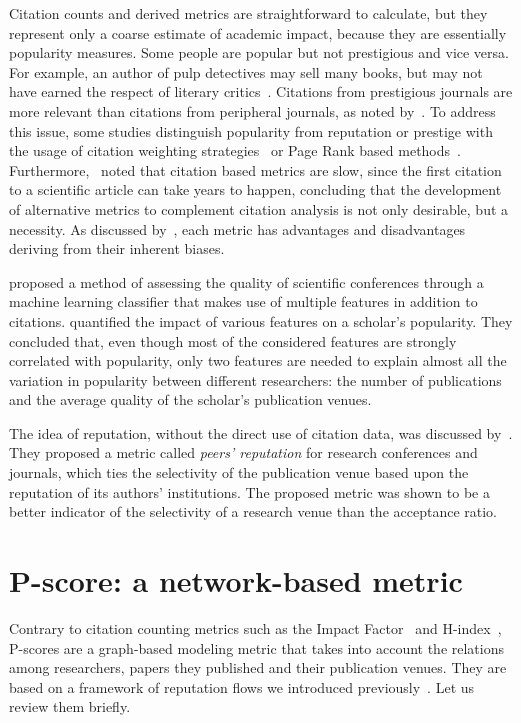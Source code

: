 \documentclass[man,floatsintext]{apa6}
\let \citeA \textcite
\let \cite \parencite
\begin{document}
Citation counts and derived metrics are straightforward to calculate, but they represent only a coarse
estimate of academic impact, because they are essentially popularity measures. Some people are popular but not 
prestigious and vice versa. For example, an author of pulp detectives may sell many books, but may not have earned 
the respect of literary critics~\cite{Bollen2006}. Citations from 
prestigious journals are more relevant than citations from peripheral journals, as noted by~\citeA{Pinski1976}. To address this issue, some studies distinguish popularity from 
reputation or prestige with the usage of citation weighting strategies~\cite{Ding2011, Yan2011a} or 
Page Rank based methods~\cite{Bollen2006, Sun2007}. 
Furthermore,~\citeA{Piwowar2013} noted that citation based metrics are slow, since the 
first citation to a scientific article can take years to happen, concluding that the development of 
alternative metrics to complement citation analysis is not only desirable, but a necessity.
As discussed by~\citeA{Leydesdorff2009}, each metric has advantages and disadvantages deriving from their 
inherent biases.

\citeA{Martins2009} proposed a method of assessing the quality of scientific conferences 
through a machine learning classifier that makes use of multiple features in addition to citations.
\citeA{Goncalves2014} quantified the impact of various features on a 
scholar's popularity. They concluded that, even though most of the considered features are strongly correlated 
with popularity, only two features are needed to explain almost all the variation in popularity between different 
researchers: the number of publications and the average quality of the scholar’s publication venues. 

The idea of reputation, without the direct use of citation data, was discussed by~\citeA{Nelakuditi2011}. They proposed a metric called \textit{peers' reputation} for 
research conferences and journals, which ties the selectivity of the publication venue based upon 
the reputation of its authors' institutions. The proposed metric was shown to be a better indicator 
of the selectivity of a research venue than the acceptance ratio.

\section{P-score: a network-based metric} 
\label{pscore} 

Contrary to citation counting metrics such as the Impact 
Factor~\cite{Garfield1955a, Saha2003, Thomson2017, Balaban2012} and 
H-index~\cite{Benevenuto2016, Bar-Ilan2008, Egghe2008, Bornmann2005, Bornmann2011}, 
P-scores are a graph-based modeling metric that takes into account 
the relations among researchers, papers they published and their publication venues. They are 
based on a framework of reputation flows we introduced previously~\cite{Ribas2015}. Let us review 
them briefly. 
\end{document}
